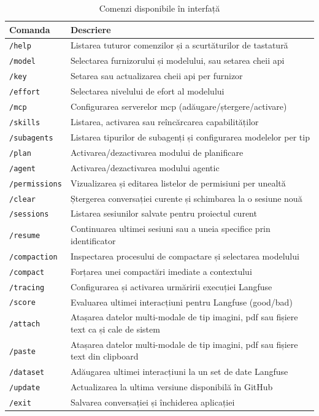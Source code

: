 \documentclass[12pt, a4paper, oneside, romanian]{teza-upb}
\begin{document}
  \begin{table}[H]
    \centering
    \small
    \begin{tabularx}{\textwidth}{l X}
      \toprule
      \textbf{Comanda} & \textbf{Descriere} \\
      \midrule
      \texttt{/help} & Listarea tuturor comenzilor și a scurtăturilor de tastatură \\
      \texttt{/model} & Selectarea furnizorului și modelului, sau setarea cheii \ac{api} \\
      \texttt{/key} & Setarea sau actualizarea cheii \ac{api} per furnizor \\
      \texttt{/effort} & Selectarea nivelului de efort al modelului \\
      \texttt{/mcp} & Configurarea serverelor \ac{mcp} (adăugare/ștergere/activare) \\
      \texttt{/skills} & Listarea, activarea sau reîncărcarea capabilităților \\
      \texttt{/subagents} & Listarea tipurilor de subagenți și configurarea modelelor per tip \\
      \texttt{/plan} & Activarea/dezactivarea modului de planificare \\
      \texttt{/agent} & Activarea/dezactivarea modului agentic \\
      \texttt{/permissions} & Vizualizarea și editarea listelor de permisiuni per unealtă \\
      \texttt{/clear} & Ștergerea conversației curente și schimbarea la o sesiune nouă \\
      \texttt{/sessions} & Listarea sesiunilor salvate pentru proiectul curent \\
      \texttt{/resume} & Continuarea ultimei sesiuni sau a uneia specifice prin identificator \\
      \texttt{/compaction} & Inspectarea procesului de compactare și selectarea modelului \\
      \texttt{/compact} & Forțarea unei compactări imediate a contextului \\
      \texttt{/tracing} & Configurarea și activarea urmăririi execuției Langfuse \\
      \texttt{/score} & Evaluarea ultimei interacțiuni pentru Langfuse (good/bad) \\
      \texttt{/attach} & Atașarea datelor multi-modale de tip imagini, \ac{pdf} sau fișiere text ca și cale de sistem \\
      \texttt{/paste} & Atașarea datelor multi-modale de tip imagini, \ac{pdf} sau fișiere text din clipboard\\
      \texttt{/dataset} & Adăugarea ultimei interacțiuni la un set de date Langfuse \\
      \texttt{/update} & Actualizarea la ultima versiune disponibilă în GitHub \\
      \texttt{/exit} & Salvarea conversației și închiderea aplicației \\
      \bottomrule
    \end{tabularx}
    \caption{Comenzi disponibile în interfață}
    \label{tab:ui-commands}
  \end{table}
\end{document}
